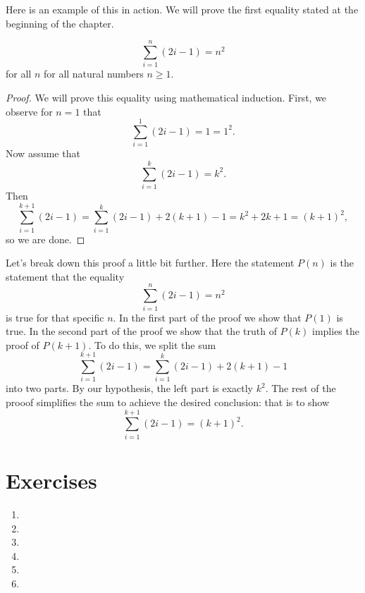 Here is an example of this in action. We will prove the first equality stated at the beginning of the chapter.
\begin{proposition}
\[\sum_{i = 1}^n(2i - 1) = n^2\] for all $n$ for all natural numbers $n \geq 1$.
\end{proposition}
\begin{proof}
We will prove this equality using mathematical induction. First, we observe for $n = 1$ that
\[\sum_{i = 1}^1(2i - 1) = 1 = 1^2.\]
Now assume that 
\[\sum_{i = 1}^k(2i - 1) = k^2.\]
Then
\[\sum_{i = 1}^{k + 1}(2i - 1) = \sum_{i = 1}^k(2i - 1) + 2(k + 1) - 1 = k^2 + 2k + 1 = (k + 1)^2,\]
so we are done.
\end{proof}

Let's break down this proof a little bit further. Here the statement $P(n)$ is the statement that the equality 
\[\sum_{i = 1}^n(2i - 1) = n^2\] is true for that specific $n$. In the first part of the proof we show that $P(1)$ is true. In the second part of the proof we show that the truth of $P(k)$ implies the proof of $P(k + 1)$. To do this, we split the sum
\[\sum_{i = 1}^{k + 1}(2i - 1) = \sum_{i = 1}^k(2i - 1) + 2(k + 1) - 1\]
into two parts. By our hypothesis, the left part is exactly $k^2$. The rest of the prooof simplifies the sum to achieve the desired conclusion: that is to show 
\[\sum_{i = 1}^{k + 1}(2i - 1) = (k + 1)^2.\]

\section{Exercises}
\begin{enumerate}
    \item 
    \item 
    \item 
    \item 
    \item 
    \item 
\end{enumerate}

